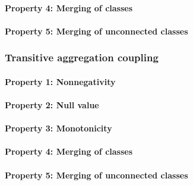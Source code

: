 \paragraph{Property 4: Merging of classes}

\paragraph{Property 5: Merging of unconnected classes}

\subsubsection{Transitive aggregation coupling}
\paragraph{Property 1: Nonnegativity}

\paragraph{Property 2: Null value}

\paragraph{Property 3: Monotonicity}

\paragraph{Property 4: Merging of classes}

\paragraph{Property 5: Merging of unconnected classes}

